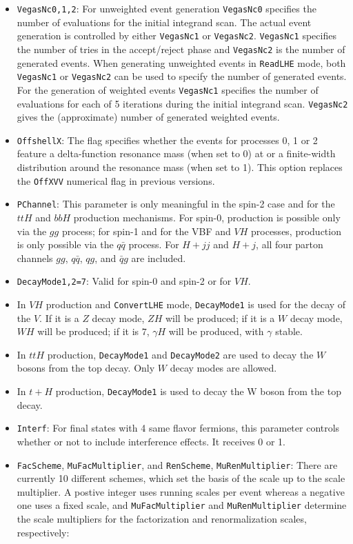 \documentclass[aps,superscriptaddress,nofootinbib]{revtex4}
\begin{document}
\begin{itemize}
\item {\verb|VegasNc0,1,2|}: For unweighted event generation \verb|VegasNc0| specifies the number of evaluations for the initial integrand scan.  The actual event generation is controlled by either \verb|VegasNc1| or \verb|VegasNc2|. \verb|VegasNc1| specifies the number of tries in the accept/reject phase and \verb|VegasNc2| is the number of generated events. When generating unweighted events in \verb|ReadLHE| mode, both \verb|VegasNc1| or \verb|VegasNc2| can be used to specify the number of generated events. For the generation of weighted events \verb|VegasNc1| specifies the number of evaluations for each of 5 iterations during the initial integrand scan. \verb|VegasNc2| gives the (approximate) number of generated weighted events.
\item {\verb|OffshellX|}: The flag specifies whether the events for processes 0, 1 or 2 feature a delta-function resonance mass (when set to 0) at or a finite-width distribution around the resonance mass (when set to 1). This option replaces the \verb|OffXVV| numerical flag in previous versions.
\item \verb|PChannel|: This parameter is only meaningful in the spin-2 case and for the $ttH$ and $bbH$ production mechanisms.  For spin-0, production is possible only via the $gg$ process; for spin-1 and for the VBF and $VH$ processes, production is only possible via the $q\bar{q}$ process.  For $H+jj$ and $H+j$, all four parton channels $gg$, $q\bar{q}$, $qg$, and $\bar{q}g$ are included.
\item \verb|DecayMode1,2=7|: Valid for spin-0 and spin-2 or for $VH$.
\item In $VH$ production and \verb|ConvertLHE| mode, \verb|DecayMode1| is used for the decay of the $V$.  If it is a $Z$ decay mode, $ZH$ will be produced; if it is a $W$ decay mode, $WH$ will be produced; if it is $7$, $\gamma H$ will be produced, with $\gamma$ stable.
\item In $ttH$ production, \verb|DecayMode1| and \verb|DecayMode2| are used to decay the $W$ bosons from the top decay.  Only $W$ decay modes are allowed.
\item In $t+H$ production, \verb|DecayMode1| is used to decay the W boson from the top decay.
\item \verb|Interf|: For final states with 4 same flavor fermions, this parameter controls whether or not to include interference effects. It receives 0 or 1.
\item \verb|FacScheme|, \verb|MuFacMultiplier|, and \verb|RenScheme|, \verb|MuRenMultiplier|: There are currently 10 different schemes, which set the basis of the scale up to the scale multiplier. A postive integer uses running scales per event whereas a negative one uses a fixed scale, and \verb|MuFacMultiplier| and \verb|MuRenMultiplier| determine the scale multipliers for the factorization and renormalization scales, respectively:

\end{itemize}
\end{document}
